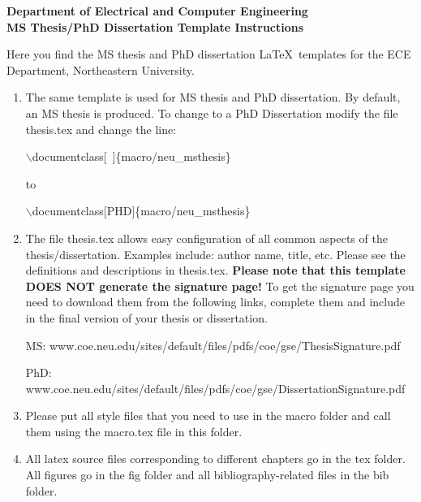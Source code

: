 \documentclass[11pt]{article}
\begin{document}
\begin{center}
\textbf{{\Large
Department of Electrical and Computer Engineering\\ [12pt]
MS Thesis/PhD Dissertation Template Instructions}}
\end{center}

\vspace*{1cm}

\noindent Here you find the MS thesis and PhD dissertation \LaTeX\ templates for the ECE Department, Northeastern University.

\begin{enumerate}
\item The same template is used for MS thesis and PhD dissertation. By default, an MS thesis is produced. To change to a PhD Dissertation modify the file thesis.tex and change the line:

$\backslash${documentclass}[~]\{macro/neu\_msthesis\}

to

$\backslash${documentclass}[PHD]\{macro/neu\_msthesis\}


\item The file thesis.tex allows easy configuration of all common aspects of the
thesis/dissertation. Examples include: author name, title, etc. Please see the definitions and descriptions in thesis.tex. \textcolor[rgb]{1.00,0.00,0.00}{\textbf{Please note that this template DOES NOT generate the signature page!}} To get the signature page you need to download them from the following links, complete them and include in the final version of your thesis or dissertation.

MS: www.coe.neu.edu/sites/default/files/pdfs/coe/gse/ThesisSignature.pdf

PhD: www.coe.neu.edu/sites/default/files/pdfs/coe/gse/DissertationSignature.pdf

\item Please put all style files that you need to use in the macro folder and call
them using the macro.tex file in this folder.

\item All latex source files corresponding to different chapters go in the tex folder. All figures go in the fig folder and all bibliography-related files in the bib folder.


\end{enumerate}
\end{document}
